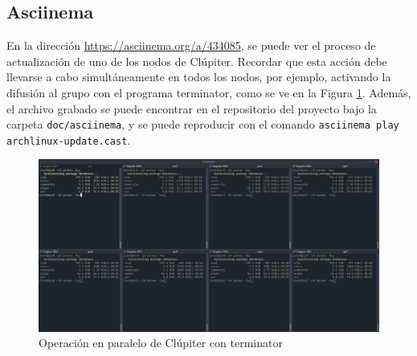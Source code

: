 \subsection{Asciinema}
En la dirección \url{https://asciinema.org/a/434085}, se puede ver el proceso de actualización de uno de los nodos de Clúpiter. Recordar que esta acción debe llevarse a cabo simultáneamente en todos los nodos, por ejemplo, activando la difusión al grupo con el programa terminator, como se ve en la Figura \ref{fig:terminator_update}. Además, el archivo grabado se puede encontrar en el repositorio del proyecto bajo la carpeta \texttt{doc/asciinema}, y se puede reproducir con el comando \texttt{asciinema play archlinux-update.cast}.

\begin{figure}[h!]
  \centering
  \includegraphics[width=\textwidth]{img/terminator_update.png}
  \caption{Operación en paralelo de Clúpiter con terminator}
  \label{fig:terminator_update}
\end{figure}